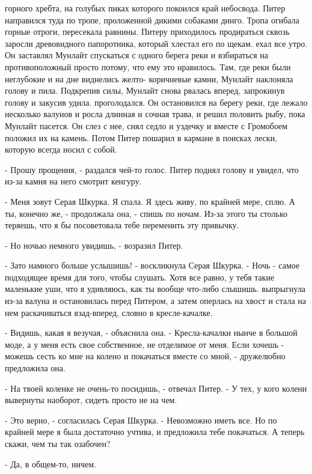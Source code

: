 горного хребта, на голубых пиках которого покоился край небосвода. 
Питер направился туда по тропе, проложенной дикими собаками динго. 
Тропа огибала горные отроги, пересекала равнины. Питеру приходилось 
продираться сквозь заросли древовидного папоротника, который хлестал 
его по щекам.
 ехал все утро. Он заставлял Мунлайт спускаться с одного берега 
реки и взбираться на противоположный просто потому, что ему это 
нравилось. Там, где реки были неглубокие и на дне виднелись желто-
коричневые камни, Мунлайт наклоняла голову и пила. Подкрепив силы, 
Мунлайт снова рвалась вперед, запрокинув голову и закусив удила.
 проголодался. Он остановился на берегу реки, где лежало 
несколько валунов и росла длинная и сочная трава, и решил половить 
рыбу, пока Мунлайт пасется. Он слез с нее, снял седло и уздечку и 
вместе с Громобоем положил их на камень. Потом Питер пошарил в кармане 
в поисках лески, которую всегда носил с собой.
\par- Прошу прощения, - раздался чей-то голос. Питер поднял голову и 
увидел, что из-за камня на него смотрит кенгуру.
\par- Меня зовут Серая Шкурка. Я спала. Я здесь живу, по крайней мере, 
сплю. А ты, конечно же, - продолжала она, - спишь по ночам. Из-за 
этого ты столько теряешь, что я бы посоветовала тебе переменить эту 
привычку.
\par- Но ночью немного увидишь, - возразил Питер.
\par- Зато намного больше услышишь! - воскликнула Серая Шкурка. - Ночь 
- самое подходящее время для того, чтобы слушать. Хотя все равно, у 
тебя такие маленькие уши, что я удивляюсь, как ты вообще что-либо 
слышишь.
 выпрыгнула из-за валуна и остановилась перед Питером, а затем 
оперлась на хвост и стала на нем раскачиваться взад-вперед, словно в 
кресле-качалке.
\par- Видишь, какая я везучая, - объяснила она. - Кресла-качалки нынче 
в большой моде, а у меня есть свое собственное, не отделимое от меня. 
Если хочешь - можешь сесть ко мне на колено и покачаться вместе со 
мной, - дружелюбно предложила она.
\par- На твоей коленке не очень-то посидишь, - отвечал Питер. - У тех, 
у кого колени вывернуты наоборот, сидеть просто не на чем.
\par- Это верно, - согласилась Серая Шкурка. - Невозможно иметь все. 
Но по крайней мере я была достаточно учтива, и предложила тебе 
покачаться. А теперь скажи, чем ты так озабочен?
\par- Да, в общем-то, ничем.
